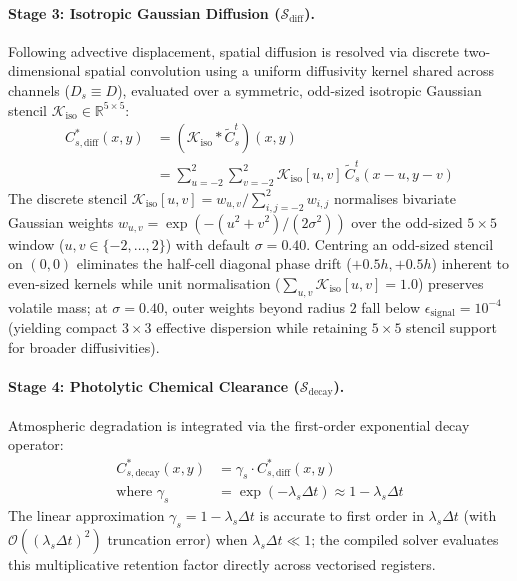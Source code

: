\paragraph{Stage 3: Isotropic Gaussian Diffusion ($\mathcal{S}_{\text{diff}}$).}
Following advective displacement, spatial diffusion is resolved via discrete two-dimensional spatial convolution using a uniform diffusivity kernel shared across channels ($D_s \equiv D$), evaluated over a symmetric, odd-sized isotropic Gaussian stencil $\mathcal{K}_{\text{iso}} \in \mathbb{R}^{5 \times 5}$:
\begin{align}
  C_{s,\text{diff}}^{*}(x, y) &= \left( \mathcal{K}_{\text{iso}} * \tilde{C}_s^t \right)(x, y) \nonumber \\
  &= \sum_{u=-2}^2 \sum_{v=-2}^2 \mathcal{K}_{\text{iso}}[u, v] \, \tilde{C}_s^t(x - u, y - v)
  \label{eq:gaussian_convolution}
\end{align}
The discrete stencil $\mathcal{K}_{\text{iso}}[u, v] = w_{u,v} / \sum_{i,j=-2}^{2} w_{i,j}$ normalises bivariate Gaussian weights $w_{u,v} = \exp\!\left(-(u^2 + v^2) / (2\sigma^2)\right)$ over the odd-sized $5 \times 5$ window ($u, v \in \{-2, \dots, 2\}$) with default $\sigma = 0.40$. Centring an odd-sized stencil on $(0, 0)$ eliminates the half-cell diagonal phase drift ($+0.5h, +0.5h$) inherent to even-sized kernels while unit normalisation ($\sum_{u,v}\mathcal{K}_{\text{iso}}[u,v]=1.0$) preserves volatile mass; at $\sigma = 0.40$, outer weights beyond radius $2$ fall below $\epsilon_{\text{signal}} = 10^{-4}$ (yielding compact $3 \times 3$ effective dispersion while retaining $5 \times 5$ stencil support for broader diffusivities).

\paragraph{Stage 4: Photolytic Chemical Clearance ($\mathcal{S}_{\text{decay}}$).}
Atmospheric degradation is integrated via the first-order exponential decay operator:
\begin{align}
  C_{s,\text{decay}}^{*}(x, y) &= \gamma_s \cdot C_{s,\text{diff}}^{*}(x, y) \nonumber \\
  \text{where } \gamma_s &= \exp\left( -\lambda_s \Delta t \right) \approx 1 - \lambda_s \Delta t
  \label{eq:photolytic_decay_step}
\end{align}
The linear approximation $\gamma_s = 1 - \lambda_s \Delta t$ is accurate to first order in $\lambda_s \Delta t$ (with $\mathcal{O}((\lambda_s \Delta t)^2)$ truncation error) when $\lambda_s \Delta t \ll 1$; the compiled solver evaluates this multiplicative retention factor directly across vectorised registers.

